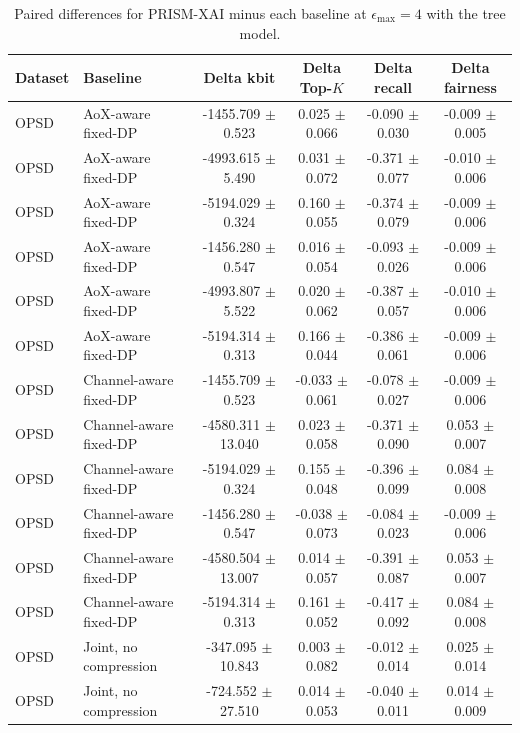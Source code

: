 \begin{table}[t]
\caption{Paired differences for PRISM-XAI minus each baseline at $\epsilon_{\max}=4$ with the tree model.}
\label{tab:paired-differences}
\centering
\scriptsize
\setlength{\tabcolsep}{3pt}
\begin{tabular}{llcccc}
\toprule
Dataset & Baseline & Delta kbit & Delta Top-$K$ & Delta recall & Delta fairness \\
\midrule
OPSD & AoX-aware fixed-DP & -1455.709 $\pm$ 0.523 & 0.025 $\pm$ 0.066 & -0.090 $\pm$ 0.030 & -0.009 $\pm$ 0.005 \\
OPSD & AoX-aware fixed-DP & -4993.615 $\pm$ 5.490 & 0.031 $\pm$ 0.072 & -0.371 $\pm$ 0.077 & -0.010 $\pm$ 0.006 \\
OPSD & AoX-aware fixed-DP & -5194.029 $\pm$ 0.324 & 0.160 $\pm$ 0.055 & -0.374 $\pm$ 0.079 & -0.009 $\pm$ 0.006 \\
OPSD & AoX-aware fixed-DP & -1456.280 $\pm$ 0.547 & 0.016 $\pm$ 0.054 & -0.093 $\pm$ 0.026 & -0.009 $\pm$ 0.006 \\
OPSD & AoX-aware fixed-DP & -4993.807 $\pm$ 5.522 & 0.020 $\pm$ 0.062 & -0.387 $\pm$ 0.057 & -0.010 $\pm$ 0.006 \\
OPSD & AoX-aware fixed-DP & -5194.314 $\pm$ 0.313 & 0.166 $\pm$ 0.044 & -0.386 $\pm$ 0.061 & -0.009 $\pm$ 0.006 \\
OPSD & Channel-aware fixed-DP & -1455.709 $\pm$ 0.523 & -0.033 $\pm$ 0.061 & -0.078 $\pm$ 0.027 & -0.009 $\pm$ 0.006 \\
OPSD & Channel-aware fixed-DP & -4580.311 $\pm$ 13.040 & 0.023 $\pm$ 0.058 & -0.371 $\pm$ 0.090 & 0.053 $\pm$ 0.007 \\
OPSD & Channel-aware fixed-DP & -5194.029 $\pm$ 0.324 & 0.155 $\pm$ 0.048 & -0.396 $\pm$ 0.099 & 0.084 $\pm$ 0.008 \\
OPSD & Channel-aware fixed-DP & -1456.280 $\pm$ 0.547 & -0.038 $\pm$ 0.073 & -0.084 $\pm$ 0.023 & -0.009 $\pm$ 0.006 \\
OPSD & Channel-aware fixed-DP & -4580.504 $\pm$ 13.007 & 0.014 $\pm$ 0.057 & -0.391 $\pm$ 0.087 & 0.053 $\pm$ 0.007 \\
OPSD & Channel-aware fixed-DP & -5194.314 $\pm$ 0.313 & 0.161 $\pm$ 0.052 & -0.417 $\pm$ 0.092 & 0.084 $\pm$ 0.008 \\
OPSD & Joint, no compression & -347.095 $\pm$ 10.843 & 0.003 $\pm$ 0.082 & -0.012 $\pm$ 0.014 & 0.025 $\pm$ 0.014 \\
OPSD & Joint, no compression & -724.552 $\pm$ 27.510 & 0.014 $\pm$ 0.053 & -0.040 $\pm$ 0.011 & 0.014 $\pm$ 0.009 \\

\end{tabular}
\end{table}
